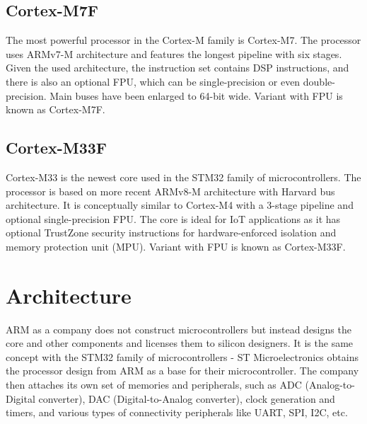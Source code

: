 	\subsection{Cortex-M7F}
	\label{sub:stm_m7}
The most powerful processor in the Cortex-M family is Cortex-M7. The processor uses ARMv7-M architecture and features the longest pipeline with six stages. Given the used architecture, the instruction set contains DSP instructions, and there is also an optional FPU, which can be single-precision or even double-precision. Main buses have been enlarged to 64-bit wide. Variant with FPU is known as Cortex-M7F. 
	
	\subsection{Cortex-M33F}
	\label{sub:stm_m33}
Cortex-M33 is the newest core used in the STM32 family of microcontrollers. The processor is based on more recent ARMv8-M architecture with Harvard bus architecture. It is conceptually similar to Cortex-M4 with a 3-stage pipeline and optional single-precision FPU. The core is ideal for IoT applications as it has optional TrustZone security instructions for hardware-enforced isolation and memory protection unit (MPU). Variant with FPU is known as Cortex-M33F. 

\section{Architecture}
\label{sec:stm_arch}
ARM as a company does not construct microcontrollers but instead designs the core and other components and licenses them to silicon designers. It is the same concept with the STM32 family of microcontrollers - ST Microelectronics obtains the processor design from ARM as a base for their microcontroller. The company then attaches its own set of memories and peripherals, such as ADC (Analog-to-Digital converter), DAC (Digital-to-Analog converter), clock generation and timers, and various types of connectivity peripherals like UART, SPI, I2C, etc.

